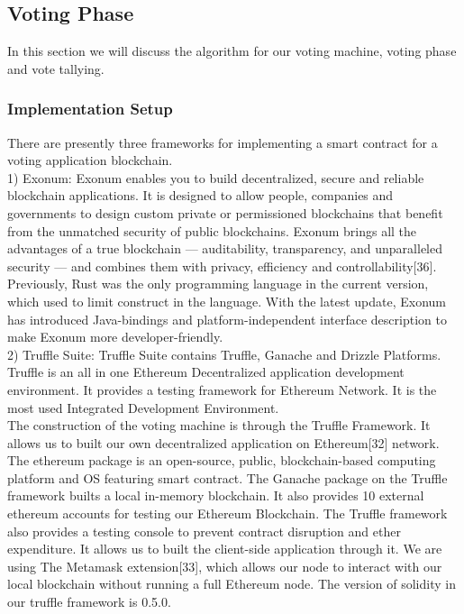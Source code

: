\documentclass{article}
\begin{document}
\subsection{Voting Phase}
In this section we will discuss the algorithm for our voting machine, voting phase and vote tallying.

\subsubsection{Implementation Setup}
There are presently three frameworks for implementing a smart contract for a voting application blockchain.\\
1) Exonum: Exonum enables you to build decentralized, secure and reliable blockchain applications. It is designed to allow people, companies and governments to design custom private or permissioned blockchains that benefit from the unmatched security of public blockchains. Exonum brings all the advantages of a true blockchain — auditability, transparency, and unparalleled security — and combines them with privacy, efficiency and controllability[36]. Previously, Rust was the only programming language in the current version, which used to limit construct in the language. With the latest update, Exonum has introduced Java-bindings and platform-independent interface description to make Exonum more developer-friendly.\\
2) Truffle Suite: Truffle Suite contains Truffle, Ganache and Drizzle Platforms. Truffle is an all in one Ethereum Decentralized application development environment. It provides a testing framework for Ethereum Network. It is the most used Integrated Development Environment.\\

The construction of the voting machine is through the Truffle Framework. It allows us to built our own decentralized application on Ethereum[32] network. The ethereum package is an open-source, public, blockchain-based computing platform and OS featuring smart contract. The Ganache package on the Truffle framework builts a local in-memory blockchain. It also provides 10 external ethereum accounts for testing our Ethereum Blockchain. The Truffle framework also provides a testing console to prevent contract disruption and ether expenditure. It allows us to built the client-side application through it. We are using The Metamask extension[33], which allows our node to interact with our local blockchain without running a full Ethereum node. The version of solidity in our truffle framework is 0.5.0.
\end{document}
